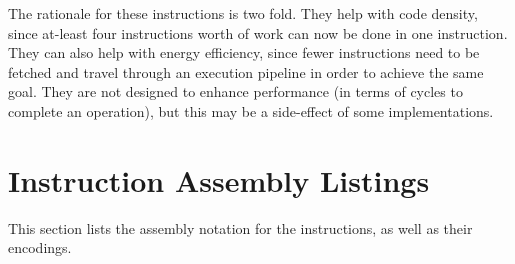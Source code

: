 The rationale for these instructions is two fold. They help with code density,
since at-least four instructions worth of work can now be done
in one instruction. They can also help with energy efficiency, since fewer
instructions need to be fetched and travel through an execution pipeline in
order to achieve the same goal. They are not designed to enhance performance
(in terms of cycles to complete an operation), but this may be a side-effect
of some implementations.

\newpage
\section{Instruction Assembly Listings}

This section lists the assembly notation for the instructions, as well as
their encodings.

